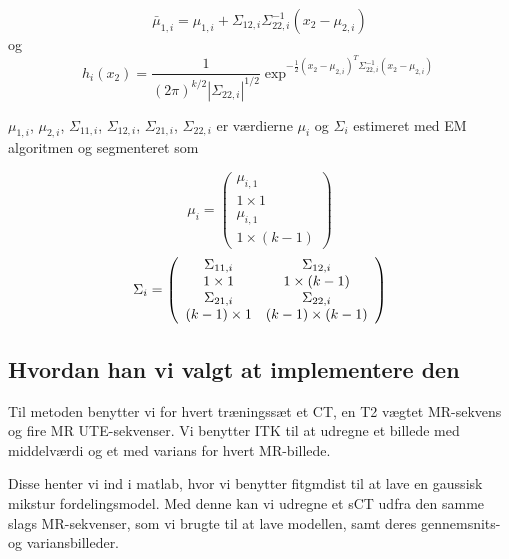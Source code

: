 \begin{equation}
 \bar{\mu}_{1,i} = \mu_{1,i} + \Sigma_{1 2, i} \Sigma^{-1}_{22, i}(x_2 - \mu_{2,i})
\end{equation}
og
\begin{equation}
h_i(x_2)= \frac{1}{( 2 \pi )^{k/2}|\Sigma_{22,i}|^{1/2}}\exp^{-\frac{1}{2}(x_2 - \mu_{2,i})^T \Sigma^{-1}_{22, i}(x_2 - \mu_{2,i})}
\end{equation}

$\mu_{1,i}$, $\mu_{2,i}$, $\Sigma_{1 1, i}$, $\Sigma_{1 2, i}$, $\Sigma_{2 1, i}$, $\Sigma_{2 2, i}$ er værdierne $\mu_i$ og $\Sigma_i$ estimeret med EM algoritmen og segmenteret som

\begin{equation}
\mu_i = \left(\begin{array}{c}
\mu_{i,1} \\ 1 \times 1 \\
\mu_{i,1} \\ 1 \times (k - 1)  
\end{array}\right)
\end{equation} 
\begin{equation}
\Sigma_i = \left(\begin{array}{c c}
\Sigma_{11,i} & \Sigma_{12,i} \\ 1 \times 1  & 1 \times (k-1)\\
\Sigma_{21,i} & \Sigma_{22,i} \\ (k-1) \times 1  & (k-1) \times (k-1)\\  
\end{array}\right)
\end{equation}

\subsection{Hvordan han vi valgt at implementere den}

Til metoden benytter vi for hvert træningssæt et CT, en T2 vægtet MR-sekvens
og fire MR UTE-sekvenser. Vi benytter ITK til at udregne et
billede med middelværdi og et med varians for hvert MR-billede.

Disse henter vi ind i matlab, hvor vi benytter fitgmdist til at lave en
gaussisk mikstur fordelingsmodel. Med denne kan vi udregne et sCT udfra den
samme slags MR-sekvenser, som vi brugte til at lave modellen, samt deres
gennemsnits- og variansbilleder.

